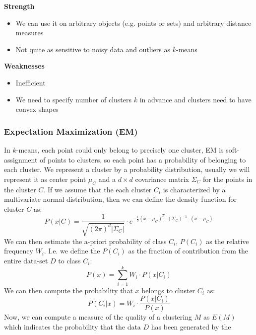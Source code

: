     \textbf{Strength}
    \begin{itemize}
        \item We can use it on arbitrary objects (e.g. points or sets) and 
        arbitrary distance measures
        \item Not quite as sensitive to noisy data and outliers as $k$-means
    \end{itemize}
    \textbf{Weaknesses}
    \begin{itemize}
        \item Inefficient
        \item We need to specify number of clusters $k$ in advance and clusters 
        need to have convex shapes
    \end{itemize}
    
    \subsubsection{Expectation Maximization (EM)}
    In $k$-means, each point could only belong to precisely one cluster, EM is 
    soft-assignment of points to clusters, so each point has a probability of 
    belonging to each cluster. We represent a cluster by a probability 
    distribution, usually we will represent it as center point $\mu_C$ and a 
    $d\times d$ covariance matrix $\Sigma_C$ for the points in the cluster $C$. 
    If we assume that the each cluster $C_i$ is characterized by a multivariate 
    normal distribution, then we can define the density function for cluster 
    $C$ as:
    \begin{equation*}
        P(x|C)=\frac{1}{\sqrt{(2\pi)^d|\Sigma_C|}} \cdot 
        e^{-\frac{1}{2}(x-\mu_C)^T \cdot (\Sigma_C)^{-1} \cdot (x-\mu_C)}
    \end{equation*}
    We can then estimate the a-priori probability of class $C_i$, $P(C_i)$ as 
    the relative frequency $W_i$. I.e. we define the $P(C_i)$ as the fraction 
    of contribution from the entire data-set $D$ to class $C_i$:
    \begin{equation*}
        P(x)=\sum_{i=1}^{k}W_i \cdot P(x|C_i)
    \end{equation*}
    We can then compute the probability that $x$ belongs to cluster $C_i$ as:
    \begin{equation*}
        P(C_i|x)=W_i \cdot \frac{P(x|C_i)}{P(x)}
    \end{equation*}
    Now, we can compute a measure of the quality of a clustering $M$ as $E(M)$ 
    which indicates the probability that the data $D$ has been generated by the 
